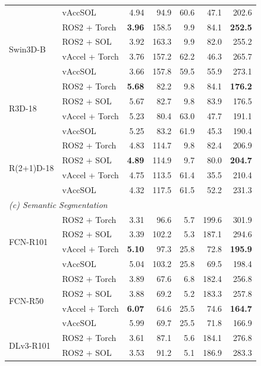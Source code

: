 \begin{table}[t]
\begin{tabular}{llrrrrr}
 & vAccSOL & 4.94 & 94.9 & 60.6 & 47.1 & 202.6 \\
\cmidrule(lr){1-7}
\multirow{4}{*}{Swin3D-B} & ROS2 + Torch & \textbf{3.96} & 158.5 & 9.9 & 84.1 & \textbf{252.5} \\
 & ROS2 + SOL & 3.92 & 163.3 & 9.9 & 82.0 & 255.2 \\
 & vAccel + Torch & 3.76 & 157.2 & 62.2 & 46.3 & 265.7 \\
 & vAccSOL & 3.66 & 157.8 & 59.5 & 55.9 & 273.1 \\
\cmidrule(lr){1-7}
\multirow{4}{*}{R3D-18} & ROS2 + Torch & \textbf{5.68} & 82.2 & 9.8 & 84.1 & \textbf{176.2} \\
 & ROS2 + SOL & 5.67 & 82.7 & 9.8 & 83.9 & 176.5 \\
 & vAccel + Torch & 5.23 & 80.4 & 63.0 & 47.7 & 191.1 \\
 & vAccSOL & 5.25 & 83.2 & 61.9 & 45.3 & 190.4 \\
\cmidrule(lr){1-7}
\multirow{4}{*}{R(2+1)D-18} & ROS2 + Torch & 4.83 & 114.7 & 9.8 & 82.4 & 206.9 \\
 & ROS2 + SOL & \textbf{4.89} & 114.9 & 9.7 & 80.0 & \textbf{204.7} \\
 & vAccel + Torch & 4.75 & 113.5 & 61.4 & 35.5 & 210.4 \\
 & vAccSOL & 4.32 & 117.5 & 61.5 & 52.2 & 231.3 \\
\cmidrule(lr){1-7}
\midrule
\multicolumn{7}{l}{\textit{(c) Semantic Segmentation}} \\
\midrule
\multirow{4}{*}{FCN-R101} & ROS2 + Torch & 3.31 & 96.6 & 5.7 & 199.6 & 301.9 \\
 & ROS2 + SOL & 3.39 & 102.2 & 5.3 & 187.1 & 294.6 \\
 & vAccel + Torch & \textbf{5.10} & 97.3 & 25.8 & 72.8 & \textbf{195.9} \\
 & vAccSOL & 5.04 & 103.2 & 25.8 & 69.5 & 198.4 \\
\cmidrule(lr){1-7}
\multirow{4}{*}{FCN-R50} & ROS2 + Torch & 3.89 & 67.6 & 6.8 & 182.4 & 256.8 \\
 & ROS2 + SOL & 3.88 & 69.2 & 5.2 & 183.3 & 257.8 \\
 & vAccel + Torch & \textbf{6.07} & 64.6 & 25.5 & 74.6 & \textbf{164.7} \\
 & vAccSOL & 5.99 & 69.7 & 25.5 & 71.8 & 166.9 \\
\cmidrule(lr){1-7}
\multirow{4}{*}{DLv3-R101} & ROS2 + Torch & 3.61 & 87.1 & 5.6 & 184.1 & 276.8 \\
 & ROS2 + SOL & 3.53 & 91.2 & 5.1 & 186.9 & 283.3 \\

\end{tabular}
\end{table}
